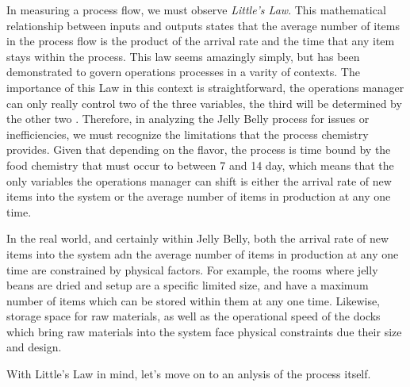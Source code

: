 In measuring a process flow, we must observe \textit{Little's Law}. This mathematical relationship between inputs and outputs states that the average number of items in the process flow is the product of the arrival rate and the time that any item stays within the process. This law seems amazingly simply, but has been demonstrated to govern operations processes in a varity of contexts. The importance of this Law in this context is straightforward, the operations manager can only really control two of the three variables, the third will be determined by the other two \parencite{littleFORUMLittleLaw2011}. Therefore, in analyzing the Jelly Belly process for issues or inefficiencies, we must recognize the limitations that the process chemistry provides. Given that depending on the flavor, the process is time bound by the food chemistry that must occur to between 7 and 14 day, which means that the only variables the operations manager can shift is either the arrival rate of new items into the system or the average number of items in production at any one time.

In the real world, and certainly within Jelly Belly, both the arrival rate of new items into the system adn the average number of items in production at any one time are constrained by physical factors. For example, the rooms where jelly beans are dried and setup are a specific limited size, and have a maximum number of items which can be stored within them at any one time. Likewise, storage space for raw materials, as well as the operational speed of the docks which bring raw materials into the system face physical constraints due their size and design.

With Little's Law in mind, let's move on to an anlysis of the process itself.
